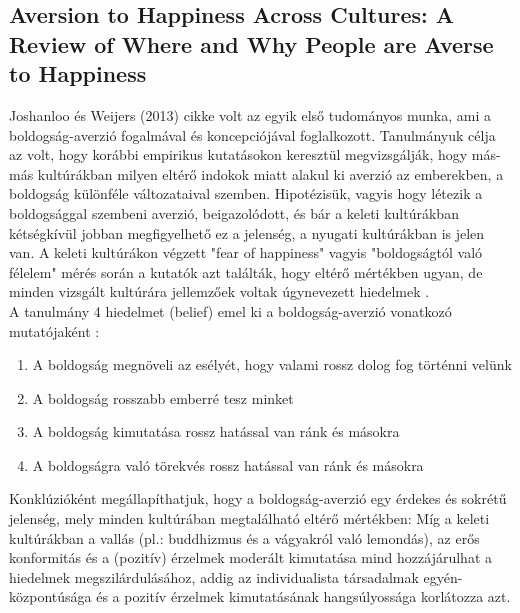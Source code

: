 \subsection{Aversion to Happiness Across Cultures: A Review
	of Where and Why People are Averse to Happiness \cite{joshanloo_weijers_2013}}
Joshanloo és Weijers (2013) cikke volt az egyik első tudományos munka, ami a boldogság-averzió fogalmával és koncepciójával foglalkozott. Tanulmányuk célja az volt, hogy korábbi empirikus kutatásokon keresztül megvizsgálják, hogy más-más kultúrákban milyen eltérő indokok miatt alakul ki averzió az emberekben, a boldogság különféle változataival szemben. Hipotézisük, vagyis hogy létezik a boldogsággal szembeni averzió, beigazolódott, és bár a keleti kultúrákban kétségkívül jobban megfigyelhető ez a jelenség, a nyugati kultúrákban is jelen van. A keleti kultúrákon végzett "fear of happiness" vagyis "boldogságtól való félelem" mérés során a kutatók azt találták, hogy eltérő mértékben ugyan, de minden vizsgált kultúrára jellemzőek voltak úgynevezett hiedelmek \cite{joshanloo_2013}. \medskip
 \\ A tanulmány 4 hiedelmet (belief) emel ki a boldogság-averzió vonatkozó mutatójaként \cite{joshanloo_weijers_2013}: 
\begin{enumerate}
	\item A boldogság megnöveli az esélyét, hogy valami rossz dolog fog történni velünk
	\item A boldogság rosszabb emberré tesz minket
	\item A boldogság kimutatása rossz hatással van ránk és másokra
	\item A boldogságra való törekvés rossz hatással van ránk és másokra

\end{enumerate}
Konklúzióként megállapíthatjuk, hogy a boldogság-averzió egy érdekes és sokrétű jelenség, mely minden kultúrában megtalálható eltérő mértékben: Míg a keleti kultúrákban a vallás (pl.: buddhizmus és a vágyakról való lemondás), az erős konformitás és a (pozitív) érzelmek moderált kimutatása mind hozzájárulhat a hiedelmek megszilárdulásához, addig az individualista társadalmak egyén-központúsága és a pozitív érzelmek kimutatásának hangsúlyossága korlátozza azt.

